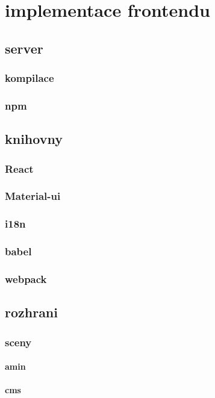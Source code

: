 \chapter{implementace frontendu}

\section{server}
\subsection{kompilace}
\subsection{npm}

\section{knihovny}
\subsection{React}
\subsection{Material-ui}
\subsection{i18n}
\subsection{babel}
\subsection{webpack}

\section{rozhrani}
\subsection{sceny}
\subsubsection{amin}
\subsubsection{cms}
